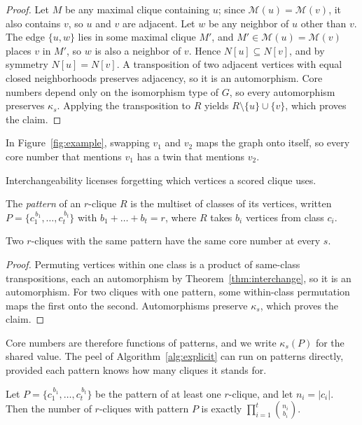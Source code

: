 \begin{proof}
Let $M$ be any maximal clique containing $u$; since $\mathcal{M}(u)=\mathcal{M}(v)$, it also contains $v$, so $u$ and $v$ are adjacent.
%
Let $w$ be any neighbor of $u$ other than $v$.
%
The edge $\{u,w\}$ lies in some maximal clique $M'$, and $M'\in\mathcal{M}(u)=\mathcal{M}(v)$ places $v$ in $M'$, so $w$ is also a neighbor of $v$.
%
Hence $N[u]\subseteq N[v]$, and by symmetry $N[u]=N[v]$.
%
A transposition of two adjacent vertices with equal closed neighborhoods preserves adjacency, so it is an automorphism.
%
Core numbers depend only on the isomorphism type of $G$, so every automorphism preserves $\kappa_s$.
%
Applying the transposition to $R$ yields $R\setminus\{u\}\cup\{v\}$, which proves the claim.
\end{proof}

In Figure~\ref{fig:example}, swapping $v_1$ and $v_2$ maps the graph onto itself, so every core number that mentions $v_1$ has a twin that mentions $v_2$.

Interchangeability licenses forgetting which vertices a scored clique uses.

\begin{definition}[Pattern]\label{def:pattern}
The \emph{pattern} of an $r$-clique $R$ is the multiset of classes of its vertices, written $P=\{c_1^{\,b_1},\dots,c_t^{\,b_t}\}$ with $b_1+\dots+b_t=r$, where $R$ takes $b_i$ vertices from class $c_i$.
\end{definition}

\begin{corollary}\label{cor:pattern}
Two $r$-cliques with the same pattern have the same core number at every $s$.
\end{corollary}

\begin{proof}
Permuting vertices within one class is a product of same-class transpositions, each an automorphism by Theorem~\ref{thm:interchange}, so it is an automorphism.
%
For two cliques with one pattern, some within-class permutation maps the first onto the second.
%
Automorphisms preserve $\kappa_s$, which proves the claim.
\end{proof}

Core numbers are therefore functions of patterns, and we write $\kappa_s(P)$ for the shared value.
%
The peel of Algorithm~\ref{alg:explicit} can run on patterns directly, provided each pattern knows how many cliques it stands for.

\begin{lemma}\label{lem:mult}
Let $P=\{c_1^{\,b_1},\dots,c_t^{\,b_t}\}$ be the pattern of at least one $r$-clique, and let $n_i=|c_i|$.
%
Then the number of $r$-cliques with pattern $P$ is exactly $\prod_{i=1}^{t}\binom{n_i}{b_i}$.
\end{lemma}

